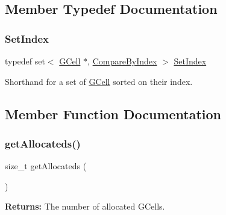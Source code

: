 \subsection{Member Typedef Documentation}
\mbox{\label{classKatabatic_1_1GCell_aacb1c215b203bfba5729f135b3221d40}} 
\subsubsection{\texorpdfstring{Set\+Index}{SetIndex}}
{\footnotesize\ttfamily typedef set$<$ \hyperlink{classKatabatic_1_1GCell}{G\+Cell} $\ast$, \hyperlink{classKatabatic_1_1GCell_1_1CompareByIndex}{Compare\+By\+Index} $>$ \hyperlink{classKatabatic_1_1GCell_aacb1c215b203bfba5729f135b3221d40}{Set\+Index}}

Shorthand for a set of \hyperlink{classKatabatic_1_1GCell}{G\+Cell} sorted on their index. 

\subsection{Member Function Documentation}
\mbox{\label{classKatabatic_1_1GCell_a91c8bc1a6bdb1b15c3c084ebfd38af47}} 
\subsubsection{\texorpdfstring{get\+Allocateds()}{getAllocateds()}}
{\footnotesize\ttfamily size\+\_\+t get\+Allocateds (\begin{DoxyParamCaption}{ }\end{DoxyParamCaption})\hspace{0.3cm}{\ttfamily [static]}}

{\bfseries Returns\+:} The number of allocated G\+Cells. \mbox{\label{classKatabatic_1_1GCell_ac594cb2832ee7ef410c89499258d38fd}} 
